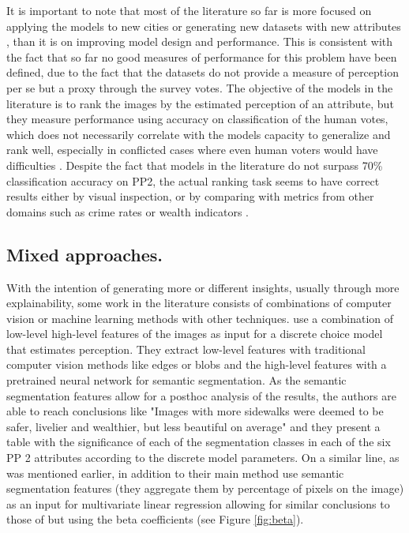 It is important to note that most of the literature so far is more focused on applying the models to new cities
\cite{zhang_measuring, santani, costa_lisbon, rossetti} or generating new datasets with new attributes
\cite{santani, zhang_uncovering}, than it is on improving model  design and performance.
This is consistent with the fact that so far no good measures of performance for this problem have been defined,
due to the fact that the datasets do not provide a measure of perception per se but a proxy through the survey votes.
The objective of the models in the literature is to rank the images by the estimated perception of an attribute, but
they measure  performance using accuracy on classification of the human votes, which does not necessarily correlate with the
models capacity to generalize and rank well, especially in conflicted cases where even human voters
would have difficulties \cite{zhang_measuring}. Despite the fact that models in the literature do not surpass 70\%
classification  accuracy on  PP2, the actual ranking task seems to have correct results either by visual inspection,
or by comparing with metrics from other domains such as crime rates or wealth indicators \cite{rossetti,zhang_measuring,tamara_judgments}.


\subsection{Mixed approaches.}
\label{section:mixed}

With the intention of generating more or different insights, usually through more explainability, some
work in the literature consists of combinations of computer vision or machine learning methods
with other techniques. use a combination of low-level high-level features
of the images as input for a discrete choice model that estimates perception. They extract low-level features
with traditional computer vision methods like edges or blobs and the high-level features with a pretrained
neural network for semantic segmentation. As the semantic segmentation features allow for a posthoc analysis of
the results, the authors are able to reach conclusions like "Images with more sidewalks were deemed to be
safer, livelier and wealthier, but less beautiful on average" and they present a table with the significance
of each of the segmentation classes in each of the six PP 2 attributes according to the discrete model parameters.
On a similar line, as was mentioned earlier,  in addition to their main method use
semantic segmentation features (they aggregate them by percentage of pixels on the image)
as an input for multivariate linear regression allowing for similar conclusions to those of 
but using the beta coefficients (see Figure \ref{fig:beta}).

